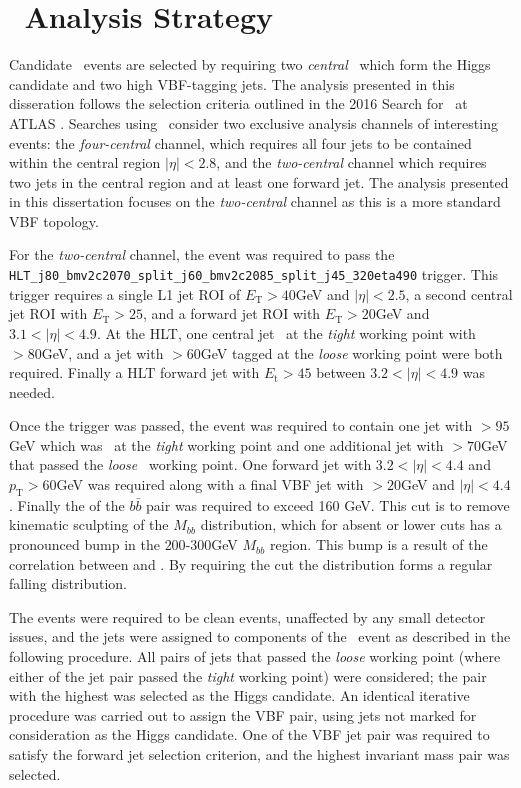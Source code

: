	\section{\VBFHBB\, Analysis Strategy}
	\label{es:as}
		Candidate \VBFHBB\, events are selected by requiring two \textit{central} \bjets\, which form the Higgs candidate and two high \pt VBF-tagging jets. The analysis presented in this disseration follows the selection criteria outlined in the 2016 Search for \VBFHBB\ at ATLAS \cite{VBFHbb8tev}. Searches using \VBFHBB\, consider two exclusive analysis channels of interesting events: the \textit{four-central} channel, which requires all four jets to be contained within the central region $|\eta| < 2.8$, and the \textit{two-central} channel which requires two jets in the central region and at least one forward jet.
		The analysis presented in this dissertation focuses on the \textit{two-central} channel as this is a more standard VBF topology.

		For the \textit{two-central} channel, the event was required to pass the \texttt{HLT\_j80\_bmv2c2070\_split\_\-j60\_bmv2c2085\_split\_j45\_320eta490} trigger. This trigger requires a single L1 jet ROI of $E_\text{T} > 40$GeV and $|\eta| < 2.5$, a second central jet ROI with $E_\text{T} > 25$, and a forward jet ROI with $E_\text{T} > 20$GeV and $3.1 < |\eta| < 4.9$.
		At the HLT, one central jet \btagged\, at the \textit{tight} working point with \pt $>80$GeV, and a jet with \pt$>60$GeV tagged at the \textit{loose} working point were both required. Finally a HLT forward jet with $E_\text{t}>45$ between $3.2 < |\eta| < 4.9$ was needed.

		Once the trigger was passed, the event was required to contain one jet with \pt$>95$GeV which was \btagged\, at the \textit{tight} working point and one additional jet with \pt$>70$GeV that passed the \textit{loose} \btag\, working point. One forward jet with $3.2 < |\eta| < 4.4$ and $p_{\text{T}}>60$GeV was required along with a final VBF jet with \pt$>20$GeV and $|\eta| < 4.4$. Finally the \pt of the $b\bar{b}$ pair was required to exceed 160 GeV. This cut is to remove kinematic sculpting of the $M_{bb}$ distribution, which for absent or lower \ptbb cuts has a pronounced bump in the $200$-$300$GeV $M_{bb}$ region. This bump is a result of the correlation between \mbb and \ptbb. By requiring the \ptbb cut the \mbb distribution forms a regular falling distribution.

		The events were required to be clean events, unaffected by any small detector issues, and the jets were assigned to components of the \VBFHBB\, event as described in the following procedure. All pairs of jets that passed the \textit{loose} working point (where either of the jet pair passed the \textit{tight} working point) were considered; the pair with the highest \ptbb was selected as the Higgs candidate. An identical iterative procedure was carried out to assign the VBF pair, using jets not marked for consideration as the Higgs candidate. One of the VBF jet pair was required to satisfy the forward jet selection criterion, and the highest invariant mass pair was selected.

